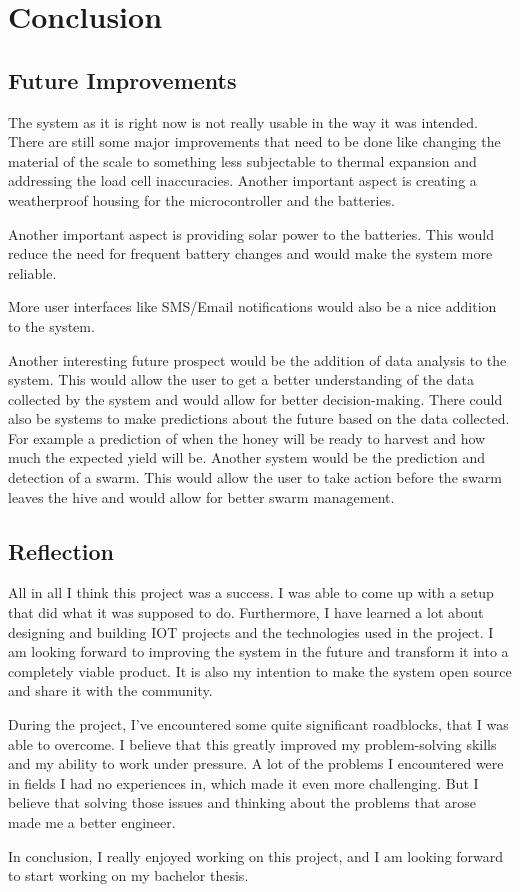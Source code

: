  \newpage
\section{Conclusion}
\subsection{Future Improvements}
The system as it is right now is not really usable in the way it was intended. There are still some major improvements that need to be done like changing the material of the scale to something less subjectable to thermal expansion and addressing the load cell inaccuracies. Another important aspect is creating a weatherproof housing for the microcontroller and the batteries.

Another important aspect is providing solar power to the batteries. This would reduce the need for frequent battery changes and would make the system more reliable.

More user interfaces like SMS/Email notifications would also be a nice addition to the system.

Another interesting future prospect would be the addition of data analysis to the system. This would allow the user to get a better understanding of the data collected by the system and would allow for better decision-making. There could also be systems to make predictions about the future based on the data collected. For example a prediction of when the honey will be ready to harvest and how much the expected yield will be. Another system would be the prediction and detection of a swarm. This would allow the user to take action before the swarm leaves the hive and would allow for better swarm management.

\newpage
\subsection{Reflection}
All in all I think this project was a success. I was able to come up with a setup that did what it was supposed to do. Furthermore, I have learned a lot about designing and building IOT projects and the technologies used in the project. I am looking forward to improving the system in the future and transform it into a completely viable product. It is also my intention to make the system open source and share it with the community.

During the project, I've encountered some quite significant roadblocks, that I was able to overcome. I believe that this greatly improved my problem-solving skills and my ability to work under pressure. A lot of the problems I encountered were in fields I had no experiences in, which made it even more challenging. But I believe that solving those issues and thinking about the problems that arose made me a better engineer.

In conclusion, I really enjoyed working on this project, and I am looking forward to start working on my bachelor thesis.
